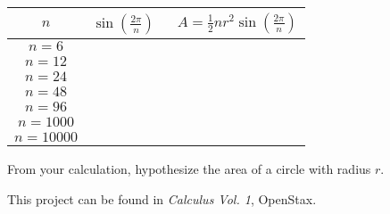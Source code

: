 \begin{center}
\begin{tabular}{ |c|c|c| } 
 \hline
 $n$ & $\sin\left(\frac{2\pi}{n}\right)$\ & $A = \frac{1}{2} nr^2\sin\left(\frac{2\pi}{n}\right)$ \\ 
 \hline
$n = 6$ &  &  \\ 
\hline
$n = 12$ &  &  \\
\hline
$n = 24$ &  &  \\
\hline
$n = 48$ &  &  \\
\hline
$n = 96$ &  &  \\
\hline
$n = 1000$ &  &  \\
\hline
$n = 10000$ &  &  \\
\hline
\end{tabular}
\end{center}

\begin{exercise}
From your calculation, hypothesize the area of a circle with radius $r$.
\end{exercise}

\blanks

\footnotesize{This project can be found in \emph{Calculus Vol. 1}, OpenStax.} \cite{openstax_calc1}





